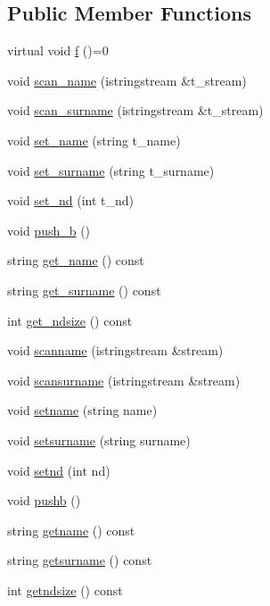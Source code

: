 \subsection*{Public Member Functions}
\begin{DoxyCompactItemize}
\item 
virtual void \mbox{\hyperlink{class_humie_a1bfe9cf46655ca5952b83c1652d8c0a1}{f}} ()=0
\item 
void \mbox{\hyperlink{class_humie_a5552bf054c13cafd3e921b7de259b2d9}{scan\+\_\+name}} (istringstream \&t\+\_\+stream)
\item 
void \mbox{\hyperlink{class_humie_a98ca5452603ec476e06c6e73fd4007bb}{scan\+\_\+surname}} (istringstream \&t\+\_\+stream)
\item 
void \mbox{\hyperlink{class_humie_ad017a3f3950555056f3e9e9c904399c8}{set\+\_\+name}} (string t\+\_\+name)
\item 
void \mbox{\hyperlink{class_humie_ac42c5deca59ef1519b43fa4cb203f551}{set\+\_\+surname}} (string t\+\_\+surname)
\item 
void \mbox{\hyperlink{class_humie_aa73ce86c3603663083ae0d5c8b532157}{set\+\_\+nd}} (int t\+\_\+nd)
\item 
void \mbox{\hyperlink{class_humie_aa6368dac76b40953826412687225f90b}{push\+\_\+b}} ()
\item 
string \mbox{\hyperlink{class_humie_ac2878f4f3c6d4c9450e286401d96d50c}{get\+\_\+name}} () const
\item 
string \mbox{\hyperlink{class_humie_a984520f9906583e9daf46c4d6ea21712}{get\+\_\+surname}} () const
\item 
int \mbox{\hyperlink{class_humie_a403431ff800cd4855abd484061a2aa85}{get\+\_\+ndsize}} () const
\item 
void \mbox{\hyperlink{class_humie_a196463eb362d5422496d02a4768fcc96}{scanname}} (istringstream \&stream)
\item 
void \mbox{\hyperlink{class_humie_af74cee32e45f3ca8a8ac006a0c9d6e58}{scansurname}} (istringstream \&stream)
\item 
void \mbox{\hyperlink{class_humie_a8c31b27d12b319b0f9951c091f6aae27}{setname}} (string name)
\item 
void \mbox{\hyperlink{class_humie_a5889715ca02459aefb71882d2f5ca65e}{setsurname}} (string surname)
\item 
void \mbox{\hyperlink{class_humie_a8ed046bd64955b9d6274c8116b58d887}{setnd}} (int nd)
\item 
void \mbox{\hyperlink{class_humie_a17c1f72bb259eaad9df23f01c8502e00}{pushb}} ()
\item 
string \mbox{\hyperlink{class_humie_af8fb98fb0497bc9275736d8e1c01b652}{getname}} () const
\item 
string \mbox{\hyperlink{class_humie_ac11db78b91e566789754bdfb5fb0e2a6}{getsurname}} () const
\item 
int \mbox{\hyperlink{class_humie_ad28e957f0069a8ee2c8a08fcf2dff1ac}{getndsize}} () const
\end{DoxyCompactItemize}
